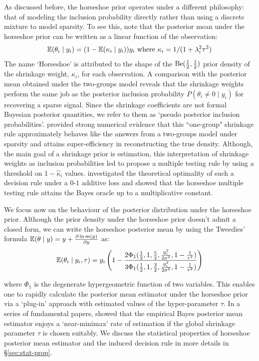 \documentclass[11pt]{article}
\begin{document}
As discussed before, the horseshoe prior operates under a different philosophy: that of modeling the inclusion probability directly rather than using a discrete mixture to model sparsity. To see this, note that the posterior mean under the horseshoe prior can be written as a linear function of the observation:
\begin{equation}
\mathbb E(\theta_i \mid y_i) = (1- \mathbb E(\kappa_i \mid y_i))y_i \text{ where } \kappa_i = 1/(1+\lambda_i^2 \tau^2)
\end{equation}
The name `Horseshoe' is attributed to the shape of the ${\rm Be} (\frac{1}{2},
\frac{1}{2})$ prior density of the shrinkage weight, $\kappa_i$, for each
observation. A comparison with the posterior mean obtained under the two-groups
model reveals that the shrinkage weights perform the same job as the posterior
inclusion probability $P(\theta_i \ne 0 \mid y_i)$ for recovering a sparse
signal. Since the shrinkage coefficients are not formal Bayesian posterior
quantities, we refer to them as `pseudo posterior inclusion probabilities'.
\citet{carvalho2010horseshoe} provided strong numerical evidence that this
``one-group" shrinkage rule approximately behaves like the answers from a
two-groups model under sparsity and attains super-efficiency in reconstructing
the true density. Although, the main goal of a shrinkage prior is estimation,
this interpretation of shrinkage weights as inclusion probabilities led
\citet{carvalho2010horseshoe} to propose a multiple testing rule by using a
threshold on $1-\hat{\kappa}_i$ values. \citet{datta2013asymptotic}
investigated the theoretical optimality of such a decision rule under a $0$-$1$
additive loss and showed that the horseshoe multiple testing rule attains the
Bayes oracle up to a multiplicative constant. 

We focus now on the behaviour of the posterior distribution under the
horseshoe prior. Although the prior density under the horseshoe prior doesn't
admit a closed form, we can write the horseshoe posterior mean by using the
Tweedies' formula $\mathbb E(\theta \mid y) = y + \frac{\partial \ln m(y)}{\partial y}$ as: 
\begin{equation}
\mathbb E(\theta_i \mid y_i, \tau) = y_i \left( 1 - \frac{2\Phi_1(\frac{1}{2}, 1, \frac{5}{2},\frac{y_i^2}{2\sigma^2}, 1-\frac{1}{\tau^2})}{3\Phi_1(\frac{1}{2}, 1, \frac{3}{2},\frac{y_i^2}{2\sigma^2}, 1-\frac{1}{\tau^2})} \right)
\end{equation}

where $\Phi_1$ is the degenerate hypergeometric function of two variables. This enables one to rapidly calculate the posterior mean estimator under the horseshoe prior via a `plug-in' approach with estimated values of the hyper-parameter $\tau$. In a series of fundamental papers, \citet{van2014horseshoe} showed that the empirical Bayes posterior mean estimator enjoys  a `near-minimax' rate of estimation if the global shrinkage parameter $\tau$ is chosen suitably. We discuss the statistical properties of horseshoe posterior mean estimator and the induced decision rule in more details in \S \ref{sec:stat-prop}. 
\end{document}
